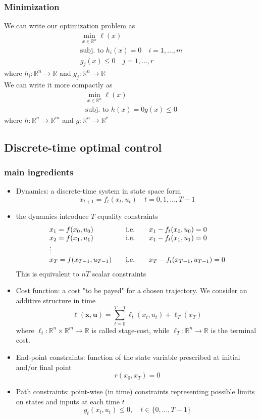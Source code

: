 \documentclass{book}
\newcommand{\R}{\mathbb{R}}
\begin{document}
\subsubsection{Minimization}
We can write our optimization problem as 
\begin{gather}
    \min_{x\in\R^n} \ell(x)\\
    \text{subj. to } h_i(x) = 0 \quad i=1,\dots,m\\
    g_j(x)\leq 0 \quad j=1,\dots,r
\end{gather}
where $h_i:\R^n\to\R$ and $g_j:\R^n\to\R$\\
We can write it more compactly as 
\begin{gather*}
    \min_{x\in\R^n} \ell(x)\\
    \text{subj. to } h(x) = 0 
    g(x)\leq 0 
\end{gather*}
where $h:\R^n\to\R^m$ and $g:\R^n\to\R^r$
\subsection{Discrete-time optimal control}
\subsubsection{main ingredients}
\begin{itemize}
    \item Dynamics: a discrete-time system in state space form 
        \[
            x_{t+1} = f_t(x_t,u_t) \quad t=0,1,\dots,T-1
        \]
    \item the dynamics introduce $T$ equality constraints 
        \[
            \begin{array}{l l l}
                x_1 = f(x_0,u_0) & \quad \text{i.e.} \quad& x_1-f_t(x_0,u_0)=0 \\
                x_2 = f(x_1,u_1) & \quad \text{i.e.} \quad & x_1-f_t(x_1,u_1)=0 \\
                \vdots \\
                x_T = f(x_{T-1},u_{T-1}) & \quad \text{i.e.} \quad & x_T-f_t(x_{T-1},u_{T-1})=0 \\
            \end{array}
        \] 
        This is equivalent to $nT$ scalar constraints
    \item Cost function: a cost "to be payed" for a chosen trajectory. We consider an additive structure in time 
        \[
            \ell(\mathbf{x},\mathbf{u}) = \displaystyle\sum_{t=0}^{T-1}\ell_t(x_t,u_t)+\ell_T(x_T)
        \]
        where $\ell_t:\R^n\times\R^m\to\R$ is called stage-cost, while $\ell_T:\R^n\to\R$ is the terminal cost. 
    \item End-point constraints: function of the state variable prescribed at initial and/or final point 
        \[
            r(x_0,x_T)=0
        \]
    \item Path constraints: point-wise (in time) constraints representing possible limits on states and inputs at each time $t$ 
        \[
            g_t(x_t,u_t)\leq 0, \quad t\in\{0,\dots,T-1\}
        \]
\end{itemize}
\end{document}
